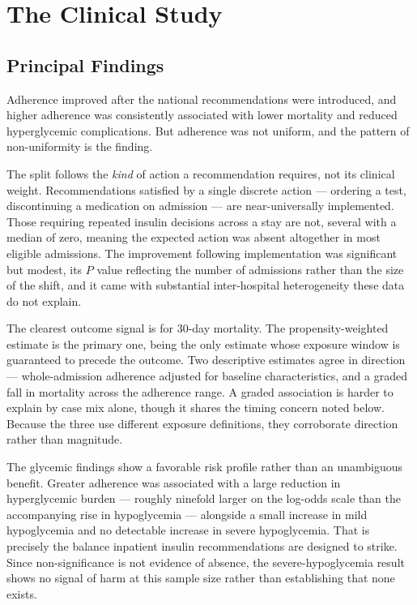 \section{The Clinical Study}
\label{sec:disc-clinical}

\subsection{Principal Findings}

Adherence improved after the national recommendations were introduced, and higher adherence was consistently associated with lower mortality and reduced hyperglycemic complications. But adherence was not uniform, and the pattern of non-uniformity is the finding.

The split follows the \emph{kind} of action a recommendation requires, not its clinical weight. Recommendations satisfied by a single discrete action --- ordering a test, discontinuing a medication on admission --- are near-universally implemented. Those requiring repeated insulin decisions across a stay are not, several with a median of zero, meaning the expected action was absent altogether in most eligible admissions. The improvement following implementation was significant but modest, its $P$ value reflecting the number of admissions rather than the size of the shift, and it came with substantial inter-hospital heterogeneity these data do not explain.

The clearest outcome signal is for $30$-day mortality. The propensity-weighted estimate is the primary one, being the only estimate whose exposure window is guaranteed to precede the outcome. Two descriptive estimates agree in direction --- whole-admission adherence adjusted for baseline characteristics, and a graded fall in mortality across the adherence range. A graded association is harder to explain by case mix alone, though it shares the timing concern noted below. Because the three use different exposure definitions, they corroborate direction rather than magnitude.

The glycemic findings show a favorable risk profile rather than an unambiguous benefit. Greater adherence was associated with a large reduction in hyperglycemic burden --- roughly ninefold larger on the log-odds scale than the accompanying rise in hypoglycemia --- alongside a small increase in mild hypoglycemia and no detectable increase in severe hypoglycemia. That is precisely the balance inpatient insulin recommendations are designed to strike. Since non-significance is not evidence of absence, the severe-hypoglycemia result shows no signal of harm at this sample size rather than establishing that none exists.


